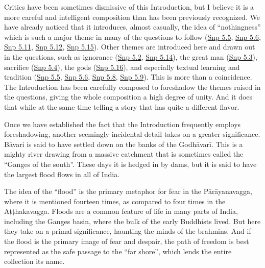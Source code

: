 \documentclass[12pt,openany]{book}%
\begin{document}
Critics have been sometimes dismissive of this Introduction, but I believe it is a more careful and intelligent composition than has been previously recognized. We have already noticed that it introduces, almost casually, the idea of “nothingness” which is such a major theme in many of the questions to follow (\href{https://suttacentral.net/snp5.5/en/sujato}{Snp 5.5}, \href{https://suttacentral.net/snp5.6/en/sujato}{Snp 5.6}, \href{https://suttacentral.net/snp5.11/en/sujato}{Snp 5.11}, \href{https://suttacentral.net/snp5.12/en/sujato}{Snp 5.12}, \href{https://suttacentral.net/snp5.15/en/sujato}{Snp 5.15}). Other themes are introduced here and drawn out in the questions, such as ignorance (\href{https://suttacentral.net/snp5.2/en/sujato}{Snp 5.2}, \href{https://suttacentral.net/snp5.14/en/sujato}{Snp 5.14}), the great man (\href{https://suttacentral.net/snp5.3/en/sujato}{Snp 5.3}), sacrifice (\href{https://suttacentral.net/snp5.4/en/sujato}{Snp 5.4}), the gods (\href{https://suttacentral.net/snp5.16/en/sujato}{Snp 5.16}), and especially textual learning and tradition (\href{https://suttacentral.net/snp5.5/en/sujato}{Snp 5.5}, \href{https://suttacentral.net/snp5.6/en/sujato}{Snp 5.6}, \href{https://suttacentral.net/snp5.8/en/sujato}{Snp 5.8}, \href{https://suttacentral.net/snp5.9/en/sujato}{Snp 5.9}). This is more than a coincidence. The Introduction has been carefully composed to foreshadow the themes raised in the questions, giving the whole composition a high degree of unity. And it does that while at the same time telling a story that has quite a different flavor.

Once we have established the fact that the Introduction frequently employs foreshadowing, another seemingly incidental detail takes on a greater significance. \textsanskrit{Bāvari} is said to have settled down on the banks of the \textsanskrit{Godhāvarī}. This is a mighty river drawing from a massive catchment that is sometimes called the “Ganges of the south”. These days it is hedged in by dams, but it is said to have the largest flood flows in all of India.

The idea of the “flood” is the primary metaphor for fear in the \textsanskrit{Pārāyanavagga}, where it is mentioned fourteen times, as compared to four times in the \textsanskrit{Aṭṭhakavagga}. Floods are a common feature of life in many parts of India, including the Ganges basin, where the bulk of the early Buddhists lived. But here they take on a primal significance, haunting the minds of the brahmins. And if the flood is the primary image of fear and despair, the path of freedom is best represented as the safe passage to the “far shore”, which lends the entire collection its name.
\end{document}
